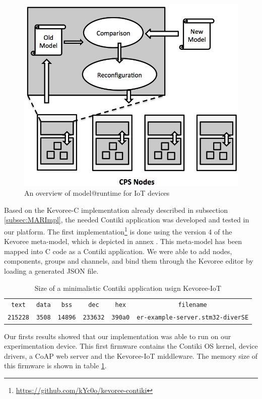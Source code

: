 \begin{figure}[htb]
	\centering
	\includegraphics[width=0.7\columnwidth]{chapters/modelsAtRuntimeContiki.images/Contribution_Overview.png}
	\caption{An overview of model@runtime for IoT devices} \label{fig:ContributionOverview}
\end{figure}

Based on the Kevoree-C implementation already described in subsection \ref{subsec:MARImpl}, the needed Contiki application was developed and tested in our platform.
The first implementation\footnote{\url{https://github.com/kYc0o/kevoree-contiki}} is done using the version 4 of the Kevoree meta-model, which is depicted in annex .
This meta-model has been mapped into C code as a Contiki application.
We were able to add nodes, components, groups and channels, and bind them through the Kevoree editor by loading a generated JSON file.

\begin{table}[htb]
	\centering
	\caption{Size of a minimalistic Contiki application usign Kevoree-IoT}
	\label{tab:kevoreeContiki}
	\begin{tabular}{cccccc}
		\texttt{text}   & \texttt{data} & \texttt{bss} & \texttt{dec}    & \texttt{hex}   & \texttt{filename} \\
		\texttt{215228} & \texttt{3508} & \texttt{14896} & \texttt{233632} & \texttt{390a0} & \texttt{er-example-server.stm32-diverSE}        
	\end{tabular}
\end{table}

Our firsts results showed that our implementation was able to run on our experimentation device.
This first firmware contains the Contiki OS kernel, device drivers, a CoAP web server and the Kevoree-IoT middleware.
The memory size of this firmware is shown in table \ref{tab:kevoreeContiki}.

